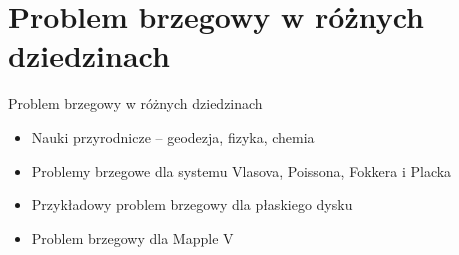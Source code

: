 \section{Problem brzegowy w różnych dziedzinach}
\begin{frame}{Problem brzegowy w różnych dziedzinach}
	\begin{itemize}
		\item Nauki przyrodnicze -- geodezja, fizyka, chemia
        \item Problemy brzegowe dla systemu Vlasova, Poissona, Fokkera i Placka
        \item Przykładowy problem brzegowy dla płaskiego dysku
        \item Problem brzegowy dla Mapple V
    \end{itemize}
\end{frame}
